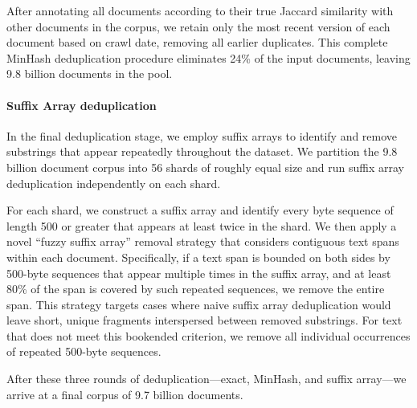 \documentclass[table]{ai2style/ai2}
\begin{document}
{{After annotating all documents according to their true Jaccard similarity with other documents in the corpus, we retain only the most recent version of each document based on crawl date, removing all earlier duplicates. This complete MinHash deduplication procedure eliminates 24\% of the input documents, leaving 9.8 billion documents in the pool.

\paragraph{Suffix Array deduplication}

In the final deduplication stage, we employ suffix arrays to identify and remove substrings that appear repeatedly throughout the dataset. We partition the 9.8 billion document corpus into 56 shards of roughly equal size and run suffix array deduplication independently on each shard.

For each shard, we construct a suffix array and identify every byte sequence of length 500 or greater that appears at least twice in the shard. We then apply a novel ``fuzzy suffix array'' removal strategy that considers contiguous text spans within each document. Specifically, if a text span is bounded on both sides by 500-byte sequences that appear multiple times in the suffix array, and at least 80\% of the span is covered by such repeated sequences, we remove the entire span. This strategy targets cases where naive suffix array deduplication would leave short, unique fragments interspersed between removed substrings. For text that does not meet this bookended criterion, we remove all individual occurrences of repeated 500-byte sequences.

After these three rounds of deduplication—exact, MinHash, and suffix array—we arrive at a final corpus of 9.7 billion documents.

}}
\end{document}
